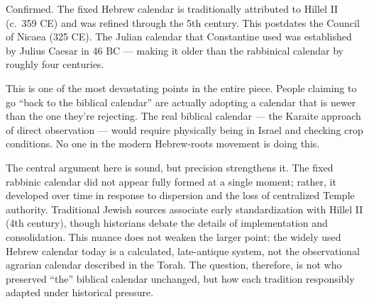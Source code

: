 \documentclass[10pt,twoside,openany]{book}
\begin{document}
\begin{reviewerbox}
Confirmed. The fixed Hebrew calendar is traditionally
attributed to Hillel II (c.\ 359 CE) and was refined
through the 5th century. This postdates the Council of
Nicaea (325 CE). The Julian calendar that Constantine
used was established by Julius Caesar in 46 BC --- making
it older than the rabbinical calendar by roughly four
centuries.

This is one of the most devastating points in the
entire piece. People claiming to go ``back to the
biblical calendar'' are actually adopting a calendar
that is newer than the one they're rejecting. The real
biblical calendar --- the Karaite approach of direct
observation --- would require physically being in Israel
and checking crop conditions. No one in the modern
Hebrew-roots movement is doing this.
\end{reviewerbox}

\begin{gptbox}
The central argument here is sound, but precision
strengthens it. The fixed rabbinic calendar did not
appear fully formed at a single moment; rather, it
developed over time in response to dispersion and the
loss of centralized Temple authority. Traditional Jewish
sources associate early standardization with Hillel II
(4th century), though historians debate the details of
implementation and consolidation. This nuance does not
weaken the larger point: the widely used Hebrew calendar
today is a calculated, late-antique system, not the
observational agrarian calendar described in the Torah.
The question, therefore, is not who preserved ``the''
biblical calendar unchanged, but how each tradition
responsibly adapted under historical pressure.
\end{gptbox}
\end{document}
